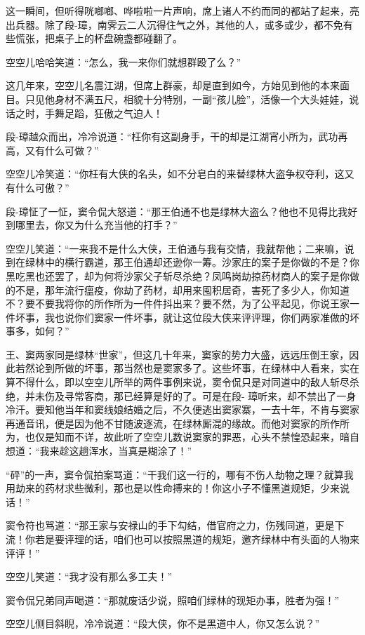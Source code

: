 \documentclass[12pt,oneside]{book}
\begin{document}
这一瞬间，但听得咣啷啷、哗啦啦一片声响，席上诸人不约而同的都站了起来，亮出兵器。除了段-璋，南霁云二人沉得住气之外，其他的人，或多或少，都不免有些慌张，把桌子上的杯盘碗盏都碰翻了。

空空儿哈哈笑道：``怎么，我一来你们就想群殴了么？''

这几年来，空空儿名震江湖，但席上群豪，却是直到如今，方始见到他的本来面目。只见他身材不满五尺，相貌十分特别，一副``孩儿脸''，活像一个大头娃娃，说话之时，手舞足蹈，狂傲之气迫人！

段-璋越众而出，冷冷说道：``枉你有这副身手，干的却是江湖宵小所为，武功再高，又有什么可做？''

空空儿冷笑道：``你枉有大侠的名头，如不分皂白的来替绿林大盗争权夺利，这又有什么可傲？''

段-璋怔了一怔，窦令侃大怒道：``那王伯通不也是绿林大盗么？他也不见得比我好到哪里去，你又为什么充当他的打手？''

空空儿笑道：``一来我不是什么大侠，王伯通与我有交情，我就帮他；二来嘛，说到在绿林中的横行霸道，那王伯通却还逊你一筹。沙家庄的案子是你做的不是？你黑吃黑也还罢了，却为何将沙家父子斩尽杀绝？凤鸣岗劫掠药材商人的案子是你做的不是，那年流行瘟疫，你劫了药材，却用来囤积居奇，害死了多少人，你知道不？要不要我将你的所作所为一件件抖出来？要不然，为了公平起见，你说王家一件坏事，我也说你们窦家一件坏事，就让这位段大侠来评评理，你们两家准做的坏事多，如何？''

王、窦两家同是绿林``世家''，但这几十年来，窦家的势力大盛，远远压倒王家，因此若然论到所做的坏事，那当然也是窦家多了。这些坏事，在绿林中人看来，实在算不得什么，即以空空儿所举的两件事例来说，窦令侃只是对同道中的敌人斩尽杀绝，并未伤及寻常客商，那已经算是好的了。可是在段-
璋听来，却不禁出了一身冷汗。要知他当年和窦线娘结婚之后，不久便逃出窦家寨，一去十年，不肯与窦家再通音讯，便是因为他不甘随波逐流，在绿林厮混的缘故。而他对窦家的所作所为，也仅是知而不详，故此听了空空儿数说窦家的罪恶，心头不禁惶恐起来，暗自想道：``我来趁这趟浑水，当真是糊涂了！''

``砰''的一声，窦令侃拍案骂道：``干我们这一行的，哪有不伤人劫物之理？就算我用劫来的药材求些微利，那也是以性命搏来的！你这小子不懂黑道规矩，少来说话！''

窦令符也骂道：``那王家与安禄山的手下勾结，借官府之力，伤残同道，更是下流！你若是要评理的话，咱们也可以按照黑道的规矩，邀齐绿林中有头面的人物来评评！''

空空儿笑道：``我才没有那么多工夫！''

窦令侃兄弟同声喝道：``那就废话少说，照咱们绿林的现矩办事，胜者为强！''

空空儿侧目斜睨，冷冷说道：``段大侠，你不是黑道中人，你又怎么说？''
\end{document}
